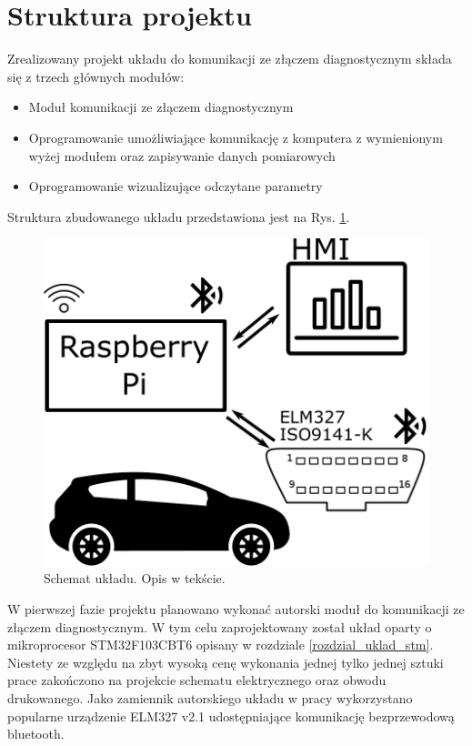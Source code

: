 \documentclass[12pt]{article} %
\numberwithin{equation}{subsection}
\numberwithin{figure}{section}
\numberwithin{table}{section}
\begin{document}
	\newpage
	
	\section{Struktura projektu}
	\hspace{0.5cm}Zrealizowany projekt układu do komunikacji ze złączem diagnostycznym składa się z trzech głównych modułów:
	
	\begin{itemize}
		\item{Moduł komunikacji ze złączem diagnostycznym}
		\item{Oprogramowanie umożliwiające komunikację z komputera z wymienionym wyżej modułem oraz zapisywanie danych pomiarowych}
		\item{Oprogramowanie wizualizujące odczytane parametry}
	\end{itemize}
	
	Struktura zbudowanego układu przedstawiona jest na Rys. \ref{rys_schemat_ukladu}.
	
		\begin{figure}[ht]
		\centering
		\includegraphics[scale=0.8]{Images/SchematUkladu.pdf}
		\caption{Schemat układu. Opis w tekście.}
		\label{rys_schemat_ukladu}
		\end{figure}
	
	W pierwszej fazie projektu planowano wykonać autorski moduł do komunikacji ze złączem diagnostycznym. W tym celu zaprojektowany został układ oparty o mikroprocesor STM32F103CBT6 opisany w rozdziale \ref{rozdzial_uklad_stm}. Niestety ze względu na zbyt wysoką cenę wykonania jednej tylko jednej sztuki prace zakończono na projekcie schematu elektrycznego oraz obwodu drukowanego. Jako zamiennik autorskiego układu w pracy wykorzystano popularne urządzenie ELM327 v2.1 udostępniające komunikację bezprzewodową bluetooth. 
	
\end{document}
